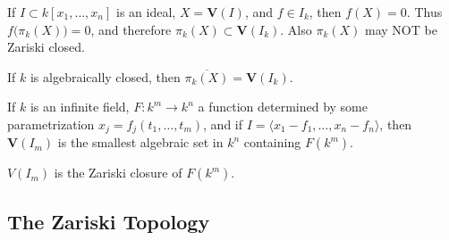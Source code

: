\documentclass[crop=false,class=book]{standalone}
\begin{document}
\begin{remark}
If $I\subset k[x_1,\hdots ,x_n]$ is an ideal, $X = \mathbf{V}(I)$, and $f\in I_k$, then $f(X) = 0$. Thus $f\big(\pi_{k}(X)\big)=0$, and therefore $\pi_{k}(X) \subset \mathbf{V}(I_k)$. Also $\pi_{k}(X)$ may NOT be Zariski closed.
\end{remark}
\begin{theorem}
If $k$ is algebraically closed, then $\overline{\pi_k(X)}=\mathbf{V}(I_k)$.
\end{theorem}
\begin{theorem}
If $k$ is an infinite field, $F:k^m \rightarrow k^n$ a function determined by some parametrization $x_j = f_j(t_1,\hdots, t_m)$, and if $I = \langle x_1-f_1,\hdots, x_n-f_n\rangle$, then $\mathbf{V}(I_m)$ is the smallest algebraic set in $k^n$ containing $F(k^m)$.
\end{theorem}
\begin{remark}
$V(I_m)$ is the Zariski closure of $F(k^m)$.
\end{remark}
\subsection{The Zariski Topology}
\end{document}
